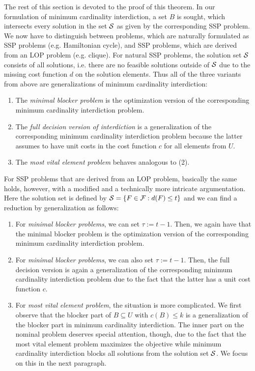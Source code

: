 The rest of this section is devoted to the proof of this theorem.
In our formulation of minimum cardinality interdiction, a set $B$ is sought, which intersects every solution in the set $\mathcal{S}$ as given by the corresponding SSP problem.
We now have to distinguish between problems, which are naturally formulated as SSP problems (e.g. Hamiltonian cycle), and SSP problems, which are derived from an LOP problem (e.g. clique).
For natural SSP problems, the solution set $\mathcal{S}$ consists of all solutions, i.e. there are no feasible solutions outside of $\mathcal{S}$ due to the missing cost function $d$ on the solution elements.
Thus all of the three variants from above are generalizations of minimum cardinality interdiction:
\begin{enumerate}
    \item The \emph{minimal blocker problem} is the optimization version of the corresponding minimum cardinality interdiction problem.
    \item The \emph{full decision version of interdiction} is a generalization of the corresponding minimum cardinality interdiction problem because the latter assumes to have unit costs in the cost function $c$ for all elements from $U$.
    \item The \emph{most vital element problem} behaves analogous to (2).
\end{enumerate}
For SSP problems that are derived from an LOP problem, basically the same holds, however, with a modified and a technically more intricate argumentation.
Here the solution set is defined by $\mathcal{S} = \{F \in \mathcal{F} : d(F) \leq t\}$ and we can find a reduction by generalization as follows:
\begin{enumerate}
    \item For \emph{minimal blocker problems}, we can set $\tau := t-1$.
    Then, we again have that the minimal blocker problem is the optimization version of the corresponding minimum cardinality interdiction problem.
    \item For \emph{minimal blocker problems}, we can also set $\tau := t-1$.
    Then, the full decision version is again a generalization of the corresponding minimum cardinality interdiction problem due to the fact that the latter has a unit cost function $c$.
    \item For \emph{most vital element problem}, the situation is more complicated.
    We first observe that the blocker part of $B \subseteq U$ with $c(B) \leq k$ is a generalization of the blocker part in minimum cardinality interdiction.
    The inner part on the nominal problem deserves special attention, though, due to the fact that the most vital element problem maximizes the objective while minimum cardinality interdiction blocks all solutions from the solution set $\mathcal{S}$.
    We focus on this in the next paragraph.
\end{enumerate}

